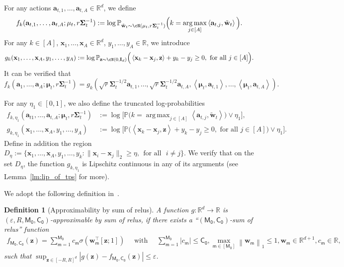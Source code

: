 \documentclass[10pt]{article}
\newtheorem{definition}[theorem]{Definition}
\newcommand{\id}{\bI}
\newcommand{\eps}{\varepsilon}
\DeclareMathOperator*{\argmax}{arg\,max}
\newcommand{\<}{\left\langle}
\renewcommand{\>}{\right\rangle}
\renewcommand{\P}{\mathbb{P}}
\newcommand{\R}{\mathbb{R}}
\newcommand{\Tpsmean}{{{\mathbf\mu}}}
\newcommand{\Tpscov}{{{\mathbf\Sigma}}}
\newcommand{\Tpssam}{{\tilde\bw}}
\newcommand{\Tpsparn}{{r}}
\newcommand{\trunprob}{{\eta_1}}
\newcommand{\Trunreg}{{D}}
\newcommand{\Trunregp}{{\eta}}
\newcommand{\ssm}{{\mathsf{m}}}
\newcommand{\neuron}{{\mathsf{M_0}}}
\newcommand{\weightn}{{{\mathsf{C_0}}}}
\def\bI{{\mathbf I}}
\def\ba{{\mathbf a}}
\def\bw{{\mathbf w}}
\def\bx{{\mathbf x}}
\def\bz{{\mathbf z}}
\begin{document}
For any actions $\ba_{t,1},\ldots,\ba_{t,A}\in\R^{d}$, we define 
\begin{align*}
f_k(\ba_{t,1},\ldots,\ba_{t,A};\Tpsmean_t,\Tpsparn\Tpscov_t^{-1}):=\log\P_{\Tpssam_t\sim\cN(\Tpsmean_t,\Tpsparn\Tpscov_t^{-1})}\Big(k =\argmax_{j\in[A]}\<\ba_{t,j},\Tpssam_t\>\Big). 
\end{align*}  
For any $k\in[A]$, $\bx_1,\ldots,\bx_A\in\R^{d}$, $y_1,\ldots,y_A\in\R$, we introduce $$
g_k(\bx_1,\ldots,\bx_A,y_1,\ldots,y_A):=\log\P_{\bz\sim\cN(0,\id_d)} \Big(\<\bx_k-\bx_j,\bz\>+y_k-y_j\geq0,\text{~for all~}j\in[A] \Big). 
$$
It can be verified that $$f_k(\ba_1,\ldots,\ba_A;\Tpsmean_t,\Tpsparn\Tpscov_t^{-1})=g_k(\sqrt{\Tpsparn}\Tpscov_t^{-1/2}\ba_{t,1},\ldots,\sqrt{\Tpsparn}\Tpscov_t^{-1/2}\ba_{t,A},\<\Tpsmean_t,\ba_{t,1}\>,\ldots,\<\Tpsmean_t,\ba_{t,A}\>).$$  

For any $\trunprob\in[0,1]$, we also define the truncated log-probabilities
\begin{align*}
f_{k,\trunprob}(\ba_{t1},\ldots,\ba_{t,A};\Tpsmean_t,\Tpsparn\Tpscov_t^{-1})&:=\log\Big[\P \Big( k =\argmax_{j \in[A]}\<\ba_{t,j},\Tpssam_t\> \Big)\vee\trunprob \Big],\\
g_{k,\trunprob}(\bx_1,\ldots,\bx_A,y_1,\ldots,y_A)&:=\log \Big[ \P \Big(\<\bx_k-\bx_j,\bz\>+y_k-y_j\geq0,\text{~for all~}j\in[A] \Big) \vee \trunprob \Big].
\end{align*}
Define in addition the region $\Trunreg_{\Trunregp}:=\{\bx_1,\ldots,\bx_A,y_1,\ldots,y_k: \|\bx_i-\bx_j\|_2\geq\Trunregp,~~\text{for all~~} i\neq j\}$. We verify that on the set $\Trunreg_\Trunregp$, the function $g_{k,\trunprob}$ is Lipschitz continuous in any of its arguments (see Lemma~\ref{lm:lip_of_tps} for more).
 
We adopt the following definition in~\cite{bai2023transformers}. 
\begin{definition}[Approximability by sum of relus]\label{def:general_mlp_approx_new}
     A function $g: \mathbb{R}^d \rightarrow \mathbb{R}$ is $(\eps, R, \neuron, \weightn)$-approximable by sum of relus, if there exists a ``$(\neuron, \weightn)$-sum of relus'' function
\begin{align*}
f_{\neuron, \weightn}(\mathbf{z})=\sum_{\ssm=1}^\neuron c_\ssm \sigma\left(\mathbf{w}_\ssm^{\top}[\mathbf{z} ; 1]\right) \quad \text { with } \quad \sum_{\ssm=1}^\neuron\left|c_\ssm\right| \leq \weightn, \max _{\ssm \in[\neuron]}\left\|\mathbf{w}_\ssm\right\|_1 \leq 1, \mathbf{w}_\ssm \in \mathbb{R}^{d+1},c_\ssm \in \mathbb{R},~
\end{align*}
such that $\sup _{\mathbf{z} \in[-R, R]^d}\left|g(\mathbf{z})-f_{\neuron,\weightn}(\mathbf{z})\right| \leq \eps$.






\end{definition}
\end{document}
